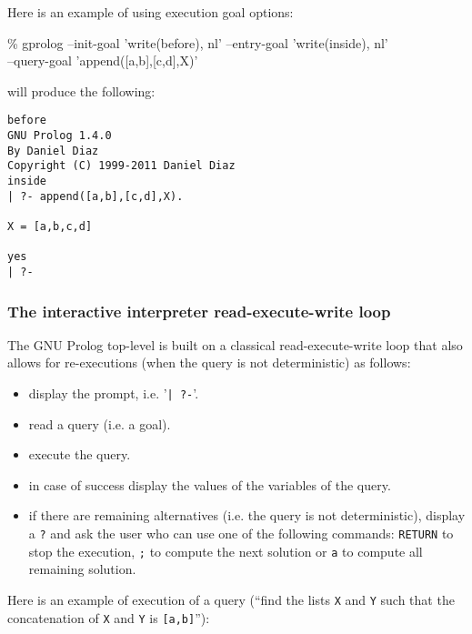 Here is an example of using execution goal options:

\begin{Code}
\% gprolog --init-goal 'write(before), nl' --entry-goal 'write(inside), nl'\\
--query-goal 'append([a,b],[c,d],X)'
\end{Code}

will produce the following:

\begin{Code}
\begin{verbatim}
before
GNU Prolog 1.4.0
By Daniel Diaz
Copyright (C) 1999-2011 Daniel Diaz
inside
| ?- append([a,b],[c,d],X).

X = [a,b,c,d]

yes
| ?-
\end{verbatim}
\end{Code}

\subsubsection{The interactive interpreter read-execute-write loop}
The GNU Prolog top-level is built on a classical read-execute-write loop that
also allows for re-executions (when the query is not deterministic) as
follows:

\begin{itemize}

\item display the prompt, i.e. '\texttt{| ?-}'.

\item read a query (i.e. a goal).

\item execute the query.

\item in case of success display the values of the variables of the query.

\item if there are remaining alternatives (i.e. the query is not
deterministic), display a \texttt{?} and ask the user who can use one of the
following commands: \texttt{RETURN} to stop the execution, \texttt{;} to
compute the next solution or \texttt{a} to compute all remaining solution.

\end{itemize}

Here is an example of execution of a query (``find the lists \texttt{X} and
\texttt{Y} such that the concatenation of \texttt{X} and \texttt{Y} is
\texttt{[a,b]}''):

